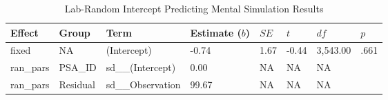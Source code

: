 \documentclass[
  man,floatsintext]{apa7}
\begin{document}
\begin{table}[tbp]

\begin{center}
\begin{threeparttable}

\caption{\label{tab:pred_lab}Lab-Random Intercept Predicting Mental Simulation Results}

\begin{tabular}{llllllll}
\toprule
Effect & Group & Term & Estimate ($b$) & $SE$ & $t$ & $df$ & $p$\\
\midrule
fixed & NA & (Intercept) & -0.74 & 1.67 & -0.44 & 3,543.00 & .661\\
ran\_pars & PSA\_ID & sd\_\_(Intercept) & 0.00 & NA & NA & NA & \\
ran\_pars & Residual & sd\_\_Observation & 99.67 & NA & NA & NA & \\
\bottomrule
\end{tabular}

\end{threeparttable}
\end{center}

\end{table}
\end{document}
